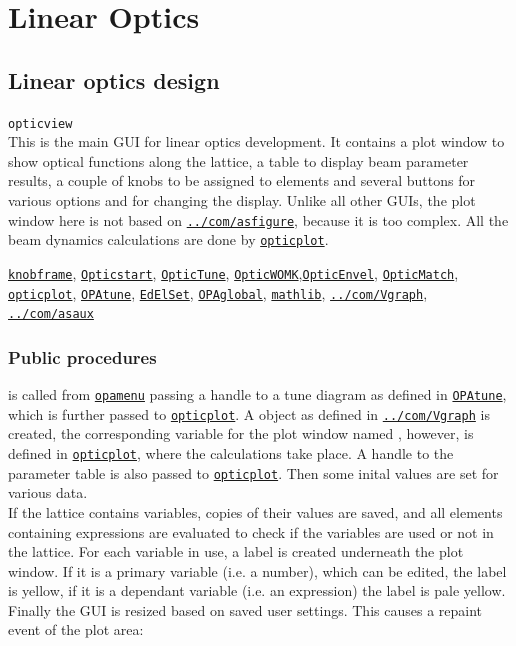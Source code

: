 \documentclass[12pt]{article}
\newcommand\code[1]{{\tt #1}}
\newcommand\guico[1]{{\color{blue}\code{#1}}}
\newcommand\guifco[1]{{\color{violet}\code{#1}}}
\newcommand{\unico}[1]{{\color{burntorange}\code{#1}}}
\newcommand{\opagui}[1]{\colorbox{blue!20}{\code{#1}}}
\newcommand{\oguih}[2]{\subsection{\label{#2}#1}{\Huge\opagui{#2}}\\}
\newcommand{\ogui}[1]{\hyperref[#1]{\opagui{#1}}}
\newcommand{\opaguif}[1]{\colorbox{violet!30}{\code{#1}}}
\newcommand{\oguif}[1]{\hyperref[#1]{\opaguif{#1}}}
\newcommand{\opauni}[1]{\colorbox{orange!30}{\code{#1}}}
\newcommand{\ouni}[1]{\hyperref[#1]{\opauni{#1}}}
\newcommand{\uses}[1]{\flushleft {\bf Uses:} #1}
\newcommand{\desc}[1]{#1}
\newcommand{\ppro}[1]{\subsubsection*{Public procedures} #1}
\begin{document}
\section{\label{seclino}Linear Optics}

\oguih{Linear optics design}{opticview} 

\desc{This is the main GUI for linear optics development. It contains a plot window to show optical functions along the lattice, a table to display beam parameter results, a couple of knobs to be assigned to elements and several buttons for various options and for changing the display. Unlike all other GUIs, the plot window here is not based on \oguif{../com/asfigure}, because it is too complex. All the beam dynamics calculations are done by \ouni{opticplot}.}

\uses{\oguif{knobframe}, \ogui{Opticstart}, \ogui{OpticTune}, \ogui{OpticWOMK},\ogui{OpticEnvel}, \ogui{OpticMatch}, \ouni{opticplot}, \ogui{OPAtune}, \ogui{EdElSet}, \ouni{OPAglobal}, \ouni{mathlib}, \oguif{../com/Vgraph}, \ouni{../com/asaux}} 

\ppro{
\guico{Init} is called from \ogui{opamenu} passing a handle to a tune diagram as defined in \ogui{OPAtune}, which is further passed to \ouni{opticplot}. A \guifco{Vplot} object as defined in \oguif{../com/Vgraph} is created, the corresponding variable for the plot window named \unico{vp}, however, is defined in \ouni{opticplot}, where the calculations take place. A handle to the parameter table \guico{tab} is also passed to \ouni{opticplot}. Then some inital values are set for various data.\\
If the lattice contains variables, copies of their values are saved, and all elements containing expressions are evaluated to check if the variables are used or not in the lattice. For each variable in use, a label is created underneath the plot window. If it is a primary variable (i.e. a number), which can be edited, the label is yellow, if it is a dependant variable (i.e. an expression) the label is pale yellow.\\
Finally the GUI is resized based on saved user settings. This causes a repaint event of the plot area:
}
\end{document}
